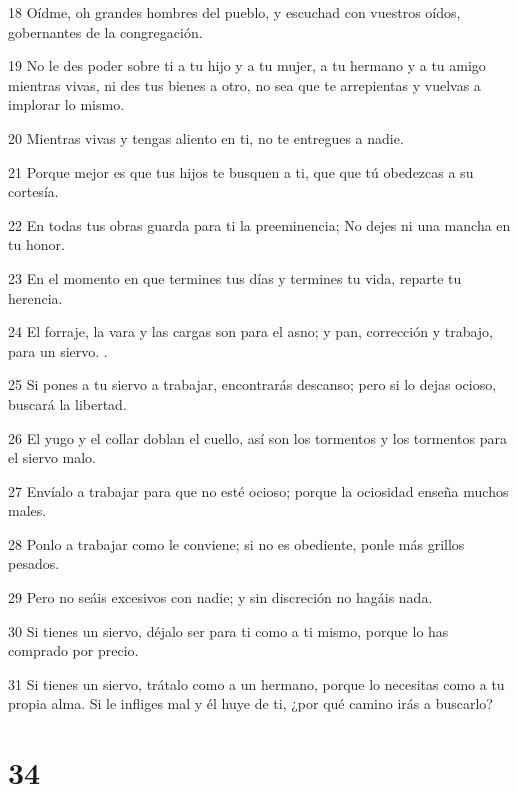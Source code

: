 \par 18 Oídme, oh grandes hombres del pueblo, y escuchad con vuestros oídos, gobernantes de la congregación.
\par 19 No le des poder sobre ti a tu hijo y a tu mujer, a tu hermano y a tu amigo mientras vivas, ni des tus bienes a otro, no sea que te arrepientas y vuelvas a implorar lo mismo.
\par 20 Mientras vivas y tengas aliento en ti, no te entregues a nadie.
\par 21 Porque mejor es que tus hijos te busquen a ti, que que tú obedezcas a su cortesía.
\par 22 En todas tus obras guarda para ti la preeminencia; No dejes ni una mancha en tu honor.
\par 23 En el momento en que termines tus días y termines tu vida, reparte tu herencia.
\par 24 El forraje, la vara y las cargas son para el asno; y pan, corrección y trabajo, para un siervo. .
\par 25 Si pones a tu siervo a trabajar, encontrarás descanso; pero si lo dejas ocioso, buscará la libertad.
\par 26 El yugo y el collar doblan el cuello, así son los tormentos y los tormentos para el siervo malo.
\par 27 Envíalo a trabajar para que no esté ocioso; porque la ociosidad enseña muchos males.
\par 28 Ponlo a trabajar como le conviene; si no es obediente, ponle más grillos pesados.
\par 29 Pero no seáis excesivos con nadie; y sin discreción no hagáis nada.
\par 30 Si tienes un siervo, déjalo ser para ti como a ti mismo, porque lo has comprado por precio.
\par 31 Si tienes un siervo, trátalo como a un hermano, porque lo necesitas como a tu propia alma. Si le infliges mal y él huye de ti, ¿por qué camino irás a buscarlo?

\chapter{34}

